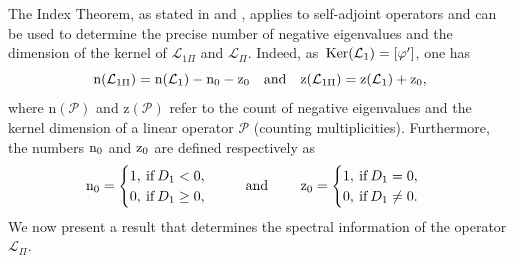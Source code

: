 \documentclass[12pt,reqno,a4paper]{amsart} %
\newcommand{\Ker}{{\rm \,Ker}}
\numberwithin{equation}{section}
\numberwithin{figure}{section}
\begin{document}
 	The Index Theorem, as stated in \cite[Theorem 5.3.2]{kapitula} and \cite[Theorem 4.1]{pel-book}, applies to self-adjoint operators and can be used to determine the precise number of negative eigenvalues and the dimension of the kernel of $\mathcal{L}_{1\Pi}$ and $\mathcal{L}_{\Pi}$. Indeed, as $\Ker(\mathcal{L}_1)=[\varphi']$, one has 
 		\begin{equation}\label{indexformula12}
 			\text{n}(\mathcal{L}_{{1\Pi}})=\text{n}(\mathcal{L}_1)-{\rm n}_0-{\rm z}_0 \quad \text{and} \quad \text{z}(\mathcal{L}_{{1\Pi}})=\text{z}(\mathcal{L}_1)+{\rm z}_0,
 		\end{equation}
 		where $\text{n}(\mathcal{P})$ and $\text{z}(\mathcal{P})$ refer to the count of negative eigenvalues and the kernel dimension of a linear operator $\mathcal{P}$ (counting multiplicities). Furthermore, the numbers ${\rm n}_0$ and ${\rm z}_0$ are defined respectively as
 		\begin{equation}\label{n0z0}
 			{\rm n}_0=
 			\begin{cases}
 				1, \: \text{if} \: D_1<0, \\
 				0, \: \text{if} \: D_1 \geq 0,\ \
 			\end{cases}
 			\quad \text{and} \qquad\ 
 			{\rm z}_0=
 			\begin{cases}
 				1, \: \text{if} \: D_1=0, \\
 				0, \: \text{if} \: D_1 \neq 0.
 			\end{cases}
 		\end{equation}
 		\indent We now present a result that determines the spectral information of the operator $\mathcal{L}_{\Pi}$.%
 		
\end{document}
